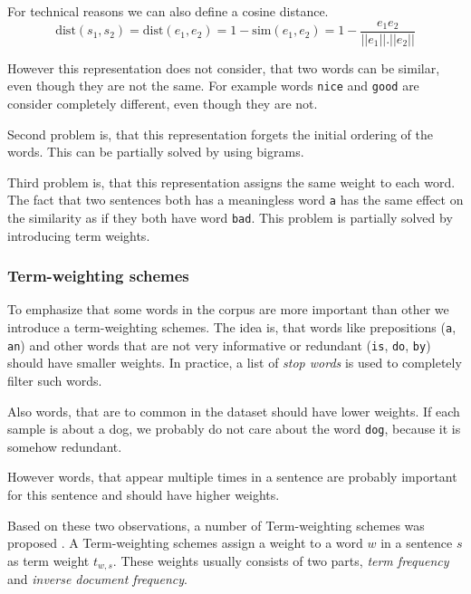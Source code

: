         For technical reasons we can also define a cosine distance. 
        $$\mathrm{dist}(s_1, s_2) = \mathrm{dist}(e_1, e_2) = 1- \mathrm{sim}(e_1, e_2) = 1 - \frac{e_1 e_2}{||e_1||.||e_2||}$$
        
        However this representation does not consider, that two words can be similar, even though they are not the same.
        For example words \texttt{nice} and \texttt{good} are consider completely different, even though they are not. 
        
        Second problem is, that this representation forgets the initial ordering of the words.
        This can be partially solved by using bigrams.
        
        Third problem is, that this representation assigns the same weight to each word.
        The fact that two sentences both has a meaningless word \texttt{a} has the same effect on the similarity as 
        if they both have word \texttt{bad}. 
        This problem is partially solved by introducing term weights.
        
        \subsubsection{Term-weighting schemes}
        To emphasize that some words in the corpus are more important than other we introduce a term-weighting schemes. 
        The idea is, that words like prepositions (\texttt{a}, \texttt{an}) and other words that are not very informative or redundant (\texttt{is}, \texttt{do}, \texttt{by}) should have smaller weights. 
        In practice, a list of \textit{stop words} is used to completely filter such words.
        
        Also words, that are to common in the dataset should have lower weights.
        If each sample is about a dog, we probably do not care about the word \texttt{dog}, because it is somehow redundant.
        
        However words, that appear multiple times in a sentence are probably important for this sentence and should have higher weights.
        
        Based on these two observations, a number of Term-weighting schemes was proposed \cite{salton1988term}.
        A Term-weighting schemes assign a weight to a word $w$ in a sentence $s$ as term weight $t_{w,s}$.
        These weights usually consists of two parts, \emph{term frequency} and \emph{inverse document frequency}. 
        
